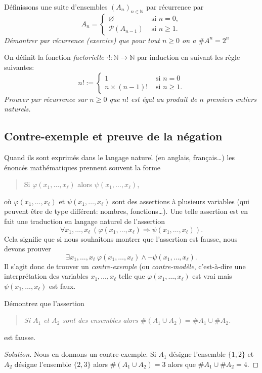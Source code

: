 \documentclass[french,course,oneside,theoremnosection]{lecture}
\newcommand{\N}{\mathbb{N}}
\newcommand{\iimplies}{\Rightarrow}
\begin{document}
\begin{example}
Définissons une suite d'ensembles $(A_n)_{n\in \N}$ par récurrence par
\[
A_n= \left\{\begin{array}{cl}
\varnothing & \text{ si } n=0,\\
\mathcal{P}(A_{n-1}) & \text{ si } n\geq 1.
\end{array}\right.
\]
\emph{Démontrer par récurrence (exercice) que pour tout $n\geq 0$ on a $\#A^n=2^n$}
\end{example}

\begin{exercise}[Factorielle]
On définit la fonction \emph{factorielle} $\cdot!\colon \N \to \N$ par induction en suivant les règle suivantes:
\[
n!:=\left\{
\begin{array}{ll}
1 & \text{ si } n=0\\
n\times (n-1)! & \text{ si } n\geq 1.
\end{array}
\right.
\]
\emph{Prouver par récurrence sur $n\geq 0$ que $n!$ est égal au produit de $n$ premiers entiers naturels.}
\end{exercise}


\subsection{Contre-exemple et preuve de la négation}

Quand ils sont exprimés dans le langage naturel (en anglais, français\ldots) les énoncés mathématiques prennent souvent la forme
\begin{quotation}
Si $\varphi(x_1, \ldots, x_\ell)$ alors $\psi(x_1, \ldots, x_\ell)$,
\end{quotation}
où $\varphi(x_1, \ldots, x_\ell)$ et $\psi(x_1, \ldots, x_\ell)$ sont des assertions à plusieurs variables (qui peuvent être de type différent: nombres, fonctions\ldots). Une telle assertion est en fait une traduction en langage naturel de l'assertion 
\[
\forall x_1, \ldots, x_\ell \ (\varphi(x_1, \ldots, x_\ell) \iimplies \psi(x_1, \ldots, x_\ell)).
\]
 Cela signifie que si nous souhaitons montrer que l'assertion est fausse, nous devons prouver 
 \[
 \exists x_1, \ldots, x_\ell \ \varphi(x_1, \ldots, x_\ell) \wedge \neg \psi(x_1, \ldots, x_\ell).
\]
Il s'agit donc de trouver un \emph{contre-exemple} (ou \emph{contre-modèle}, c'est-à-dire une interprétation des variables $x_1, \ldots, x_\ell$ telle que $\varphi(x_1, \ldots, x_\ell)$ est vrai mais $\psi(x_1, \ldots, x_\ell)$ est faux.

\begin{example}
Démontrez que l'assertion 
\begin{quotation}
\emph{Si $A_1$ et $A_2$ sont des ensembles alors $\#(A_1 \cup A_2)=\#A_1 \cup \#A_2$.}
\end{quotation}
est fausse.
\end{example}
\begin{proof}[Solution]
Nous en donnons un contre-exemple. Si $A_1$ désigne l'ensemble $\{1,2\}$ et $A_2$ désigne l'ensemble $\{2,3\}$ alors $\#(A_1 \cup A_2)=3$ alors que $\#A_1 \cup \#A_2=4$.
\end{proof}
\end{document}
